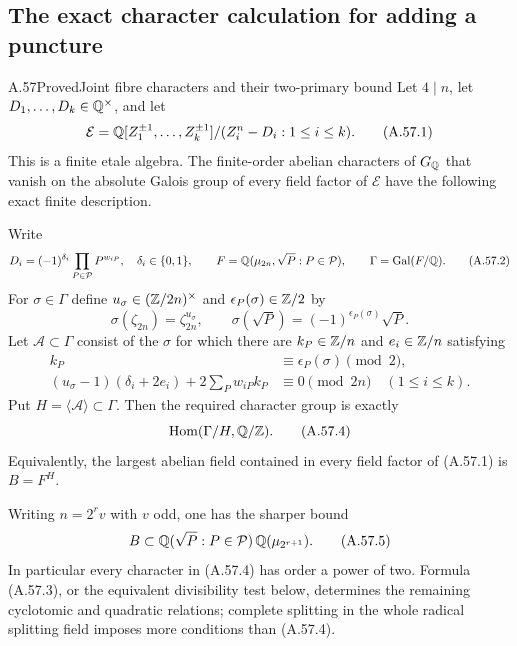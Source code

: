 \subsection{The exact character calculation for adding a puncture}

\begin{statement}{A.57}{Proved}{Joint fibre characters and their two-primary bound}
Let $4\mid n$, let $D_1,\ldots,D_k\in\mathbb Q^\times$,
and let
\[
 \mathcal E=\mathbb Q[Z_1^{\pm1},\ldots,Z_k^{\pm1}]
                    /(Z_i^n-D_i:1\le i\le k).
 \tag{A.57.1}
\]
This is a finite etale algebra. The finite-order
abelian characters of $G_\mathbb Q$ that vanish on the
absolute Galois group of every field factor of
$\mathcal E$ have the following exact finite description.

Write
\[
 D_i=(-1)^{\delta_i}\prod_{P\in\mathcal P}P^{w_{iP}},
 \quad \delta_i\in\{0,1\},\qquad
 F=\mathbb Q(\mu_{2n},\sqrt P:P\in\mathcal P),\qquad
 \Gamma=\operatorname{Gal}(F/\mathbb Q).
 \tag{A.57.2}
\]
For $\sigma\in\Gamma$ define $u_\sigma\in(\mathbb Z/2n)^\times$
and $\epsilon_P(\sigma)\in\mathbb Z/2$ by
\[
 \sigma(\zeta_{2n})=\zeta_{2n}^{u_\sigma},
 \qquad \sigma(\sqrt P)=(-1)^{\epsilon_P(\sigma)}\sqrt P.
\]
Let $\mathcal A\subset\Gamma$ consist of the $\sigma$
for which there are $k_P\in\mathbb Z/n$ and $e_i\in\mathbb Z/n$
satisfying
\[
 \begin{split}
 k_P&\equiv\epsilon_P(\sigma)\pmod2,\\
 (u_\sigma-1)(\delta_i+2e_i)
           +2\sum_Pw_{iP}k_P&\equiv0\pmod {2n}
                                  \quad(1\le i\le k).
 \end{split}
 \tag{A.57.3}
\]
Put $H=\langle\mathcal A\rangle\subset\Gamma$.
Then the required character group is exactly
\[
              \operatorname{Hom}(\Gamma/H,\mathbb Q/\mathbb Z).
 \tag{A.57.4}
\]
Equivalently, the largest abelian field contained
in every field factor of (A.57.1) is $B=F^H$.

Writing $n=2^r v$ with $v$ odd, one has the sharper
bound
\[
 B\subset
 \mathbb Q(\sqrt P:P\in\mathcal P)\,\mathbb Q(\mu_{2^{r+1}}).
 \tag{A.57.5}
\]
In particular every character in (A.57.4) has
order a power of two. Formula (A.57.3), or the
equivalent divisibility test below, determines
the remaining cyclotomic and quadratic relations;
complete splitting in the whole radical splitting
field imposes more conditions than (A.57.4).
\end{statement}
